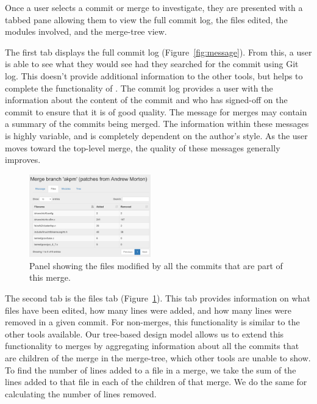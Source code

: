 \documentclass[conference, draftclsnofoot, draft]{IEEEtran}
\begin{document}
Once a user selects a commit or merge to investigate, they are presented with a
tabbed pane allowing them to view the full commit log, the files edited, the modules
involved, and the merge-tree view.

The first tab displays the full commit log (Figure~\ref{fig:message}). From this, a
user is able to see what they would see had they searched for the commit using Git
log. This doesn't provide additional information to the other tools, but helps to
complete the functionality of \tool. The commit log provides a user with the
information about the content of the commit and who has signed-off on the commit to
ensure that it is of good quality. The message for merges may contain a summary of
the commits being merged.  The information within these messages is highly variable,
and is completely dependent on the author's style. As the user moves toward the
top-level merge, the quality of these messages generally improves.

\begin{figure}
        \centering
        \includegraphics[width=0.47\textwidth]{figures/files_view_2.png}
        \caption{Panel showing the files modified by all the commits that are part
                of this merge.}
        \label{fig:files}
\end{figure}

The second tab is the files tab (Figure~\ref{fig:files}). This tab provides
information on what files have been edited, how many lines were added, and how many
lines were removed in a given commit. For non-merges, this functionality is similar
to the other tools available. Our tree-based design model allows us to extend this
functionality to merges by aggregating information about all the commits that are
children of the merge in the merge-tree, which other tools are unable to show. To
find the number of lines added to a file in a merge, we take the sum of the lines
added to that file in each of the children of that merge. We do the same for
calculating the number of lines removed.


\end{document}
